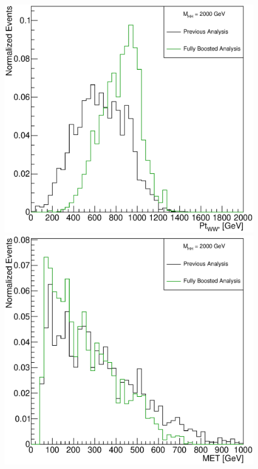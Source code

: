 \begin{figure}[h]
\begin{center}
\includegraphics[scale=0.25]{figures/WHad_plots_john_withcuts/electron/hww_pt_Xhh2000}\\
\includegraphics[scale=0.25]{figures/WHad_plots_john_withcuts/electron/wlep_met_Xhh2000}

\end{center}
\end{figure}
